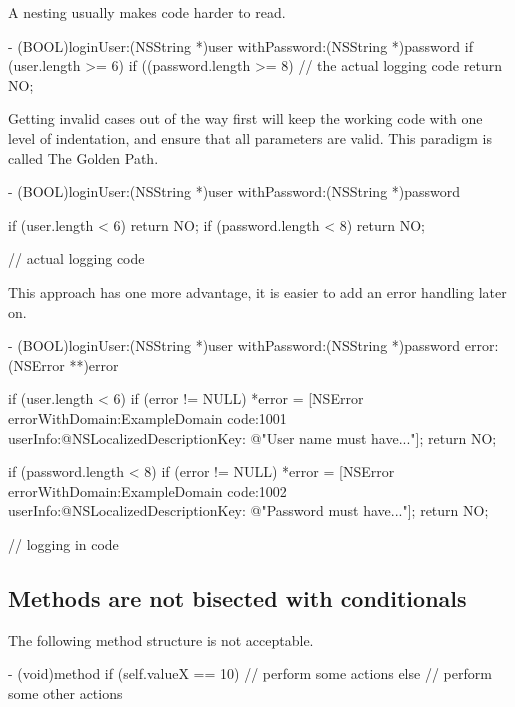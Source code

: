 \documentclass[10pt]{extarticle}
\newenvironment{codelisting}
{\footnotesize\mdframed[middlelinewidth=0.5pt, middlelinecolor=BaliHaiColor, skipabove=15pt]\verbatim}
{\endverbatim\endmdframed\vspace{12pt}\normalsize}
\begin{document}
A nesting usually makes code harder to read.

\begin{codelisting}
- (BOOL)loginUser:(NSString *)user withPassword:(NSString *)password
{
    if (user.length >= 6) {
        if ((password.length >= 8) {
            // the actual logging code
        }
    }
    return NO;
}
\end{codelisting}

Getting invalid cases out of the way first will keep the working code with one level of indentation, and ensure that all parameters are valid. This paradigm is called The Golden Path.

\begin{codelisting}
- (BOOL)loginUser:(NSString *)user withPassword:(NSString *)password
{
    if (user.length < 6) return NO;
    if (password.length < 8) return NO;
    
    // actual logging code
}
\end{codelisting}

This approach has one more advantage, it is easier to add an error handling later on.

\begin{codelisting}
- (BOOL)loginUser:(NSString *)user withPassword:(NSString *)password error:(NSError **)error
{
    if (user.length < 6) {
        if (error != NULL)
            *error = [NSError errorWithDomain:ExampleDomain
                                         code:1001
                                     userInfo:@{NSLocalizedDescriptionKey: @"User name must have..."}];
        return NO;
    }
    
    if (password.length < 8) {
        if (error != NULL)
            *error = [NSError errorWithDomain:ExampleDomain
                                         code:1002
                                     userInfo:@{NSLocalizedDescriptionKey: @"Password must have..."}];
        return NO;
    }
    
    // logging in code
}
\end{codelisting}

\subsection{Methods are not bisected with conditionals}

The following method structure is not acceptable.

\begin{codelisting}
- (void)method
{
    if (self.valueX == 10) {
        // perform some actions
    }
    else {
        // perform some other actions
    }
}
\end{codelisting}
\end{document}
